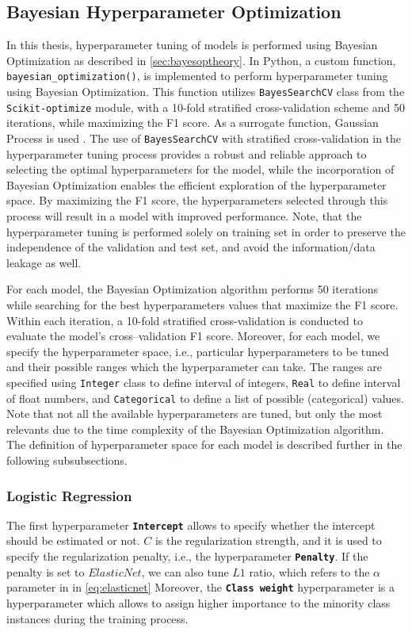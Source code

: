 \subsection{Bayesian Hyperparameter Optimization}
\label{subsec:hyperoptbayes}
In this thesis, hyperparameter tuning of models is performed using Bayesian Optimization as described in \autoref{sec:bayesoptheory}.
In Python, a custom function, \lstinline{bayesian_optimization()}, is implemented to perform hyperparameter tuning using Bayesian Optimization.
This function utilizes \lstinline{BayesSearchCV} class from the \lstinline{Scikit-optimize} module, with a 10-fold stratified cross-validation scheme and 50 iterations, while maximizing the F1 score. As a surrogate function, Gaussian Process is used \citep{scikit-opt}.
The use of \lstinline{BayesSearchCV} with stratified cross-validation in the hyperparameter tuning process provides a robust and reliable approach to selecting the optimal hyperparameters for the model, while the incorporation of Bayesian Optimization enables the efficient exploration of the hyperparameter space.
By maximizing the F1 score, the hyperparameters selected through this process will result in a model with improved performance. Note, that the hyperparameter tuning is performed solely on training set in order to preserve the independence of the validation and test set, and avoid the information/data leakage as well.

For each model, the Bayesian Optimization algorithm performs 50 iterations while searching for the best hyperparameters values that maximize the F1 score. Within each iteration, a 10-fold stratified cross-validation is conducted to evaluate the model's cross--validation F1 score.
Moreover, for each model, we specify the hyperparameter space, i.e., particular hyperparameters to be tuned and their possible ranges which the hyperparameter can take. The ranges are specified using \lstinline{Integer} class to define interval of integers, \lstinline{Real} to define interval of float numbers, and \lstinline{Categorical} to define a list of possible (categorical) values.
Note that not all the available hyperparameters are tuned, but only the most relevants due to the time complexity of the Bayesian Optimization algorithm.
The definition of hyperparameter space for each model is described further in the following subsubsections.

\subsubsection{Logistic Regression}
The first hyperparameter \textbf{\texttt{Intercept}} allows to specify whether the intercept should be estimated or not.
$C$ is the regularization strength, and it is used to specify the regularization penalty, i.e., the hyperparameter \textbf{\texttt{Penalty}}.
If the penalty is set to $ElasticNet$, we can also tune $L1$ ratio, which refers to the $\alpha$ parameter in in \autoref{eq:elasticnet}
Moreover, the  \textbf{\texttt{Class weight}} hyperparameter is a hyperparameter which allows to assign higher importance to the minority class instances during the training process.

